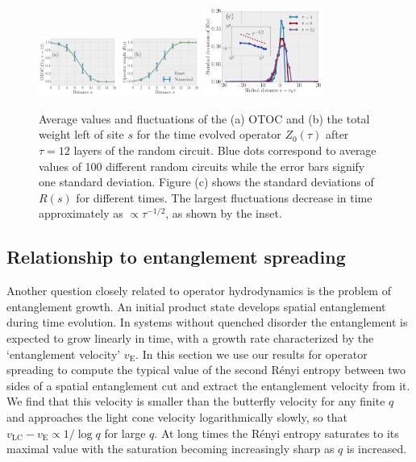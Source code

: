 \documentclass[aps,prb,twocolumn,superscriptaddress]{revtex4-1}
\begin{document}
 \begin{figure}[h!]
 \centering
  	\includegraphics[width=0.23\textwidth]{otoc_fluctuations_N=6.pdf}
  	\includegraphics[width=0.23\textwidth]{weights_fluctuations_N=6.pdf}
  	\includegraphics[width=0.35\textwidth]{random_circuit_weight_std_devs.pdf} 
\caption{Average values and fluctuations of the (a) OTOC and (b) the total weight left of site $s$ for the time evolved operator $Z_0(\tau)$ after $\tau=12$ layers of the random circuit. Blue dots correspond to average values of 100 different random circuits while the error bars signify one standard deviation. Figure (c) shows the standard deviations of $R(s)$ for different times. The largest fluctuations decrease in time approximately as $\propto \tau^{-1/2}$, as shown by the inset.}
 \label{fig:fluctuations}
 \end{figure}

\subsection{Relationship to entanglement spreading}\label{ss:randomcircuit_entanglement}

Another question closely related to operator hydrodynamics is the problem of entanglement growth. An initial product state develops spatial entanglement during time evolution. In systems without quenched disorder the entanglement is expected to grow linearly in time, with a growth rate characterized by the `entanglement velocity' $v_{\text{E}}$. In this section we use our results for operator spreading to compute the typical value of the second R\'enyi entropy between two sides of a spatial entanglement cut and extract the entanglement velocity from it. We find that this velocity is smaller than the butterfly velocity for any finite $q$ and approaches the light cone velocity logarithmically slowly, so that $v_\text{LC} - v_{\text{E}} \propto 1 / \log{q}$ for large $q$. At long times the R\'enyi entropy saturates to its maximal value with the saturation becoming increasingly sharp as $q$ is increased.
\end{document}
